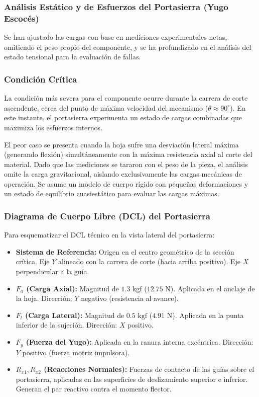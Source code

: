 \documentclass[12pt,letterpaper]{article}
\begin{document}
\subsubsection{Análisis Estático y de Esfuerzos del Portasierra (Yugo Escocés)}

Se han ajustado las cargas con base en mediciones experimentales netas, omitiendo el peso propio del componente, y se ha profundizado en el análisis del estado tensional para la evaluación de fallas.

\subsubsection{Condición Crítica}

La condición más severa para el componente ocurre durante la carrera de corte ascendente, cerca del punto de máxima velocidad del mecanismo ($\theta \approx 90^\circ$). En este instante, el portasierra experimenta un estado de cargas combinadas que maximiza los esfuerzos internos.

El peor caso se presenta cuando la hoja sufre una desviación lateral máxima (generando flexión) simultáneamente con la máxima resistencia axial al corte del material. Dado que las mediciones se tararon con el peso de la pieza, el análisis omite la carga gravitacional, aislando exclusivamente las cargas mecánicas de operación. Se asume un modelo de cuerpo rígido con pequeñas deformaciones y un estado de equilibrio cuasiestático para evaluar las cargas máximas.

\subsubsection{Diagrama de Cuerpo Libre (DCL) del Portasierra}

Para esquematizar el DCL técnico en la vista lateral del portasierra:

\begin{itemize}
    \item \textbf{Sistema de Referencia:} Origen en el centro geométrico de la sección crítica. Eje $Y$ alineado con la carrera de corte (hacia arriba positivo). Eje $X$ perpendicular a la guía.

    \item \textbf{$F_a$ (Carga Axial):} Magnitud de $1.3\text{ kgf}$ ($12.75\text{ N}$). Aplicada en el anclaje de la hoja. Dirección: $Y$ negativo (resistencia al avance).

    \item \textbf{$F_l$ (Carga Lateral):} Magnitud de $0.5\text{ kgf}$ ($4.91\text{ N}$). Aplicada en la punta inferior de la sujeción. Dirección: $X$ positivo.

    \item \textbf{$F_y$ (Fuerza del Yugo):} Aplicada en la ranura interna excéntrica. Dirección: $Y$ positivo (fuerza motriz impulsora).

    \item \textbf{$R_{x1}, R_{x2}$ (Reacciones Normales):} Fuerzas de contacto de las guías sobre el portasierra, aplicadas en las superficies de deslizamiento superior e inferior. Generan el par reactivo contra el momento flector.
\end{itemize}
\end{document}
